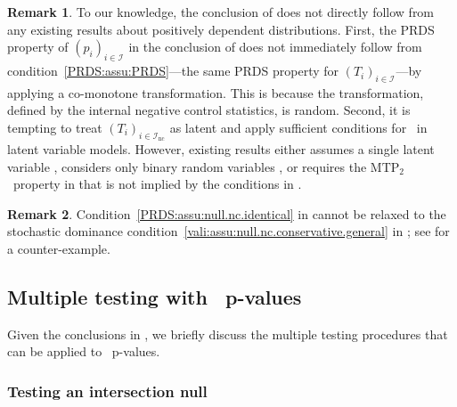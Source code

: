 \documentclass[a4paper,11pt]{article}
\theoremstyle{plain}
\theoremstyle{definition}
\newtheorem{remark}{Remark}
\def\calI{\mathcal{I}}
\theoremstyle{plain}
\newcommand{\pval}[1]{{p_{#1}}}
\newcommand{\testStatistics}[1]{{T_{#1}}}
\newcommand{\nickname}{{\text{RANC}}}
\newcommand{\hypothesisIndex}[1]{{\calI_{#1}}}
\newcommand{\PRDS}{{\text{PRDS}}}
\newcommand{\MTPTwo}{{$\text{MTP}_2$}}
\begin{document}
\begin{remark}
    To our knowledge, the conclusion of  does not
  directly follow from any existing results about positively dependent
  distributions. First, the PRDS property of $(\pval{i})_{i \in
  \hypothesisIndex{}}$ in the conclusion of  does not
immediately follow from condition~\ref{PRDS:assu:PRDS}---the same PRDS
property for $(\testStatistics{i})_{i \in \hypothesisIndex{}}$---by applying a
co-monotone transformation. This is because the transformation,
defined by the internal negative control statistics, is random. Second, it is tempting to treat
$(\testStatistics{i})_{i \in \hypothesisIndex{\text{nc}}}$ as latent
and apply sufficient conditions for \PRDS~in latent variable
models. However, existing results either assumes a single latent variable
\parencite{benjamini2001control}, considers only binary random
variables \parencite{holland1986conditional}, or requires the
\MTPTwo~property in \textcite{karlin1980classes} that is not implied
by the conditions in .
\end{remark}

\begin{remark} \label{rem:ia-cannot-relax}
Condition~\ref{PRDS:assu:null.nc.identical} in
 cannot be relaxed to the
stochastic dominance
condition~\ref{vali:assu:null.nc.conservative.general} in
; see  for a
counter-example.
\end{remark}


\subsection{Multiple testing with
  \nickname~p-values}\label{sec:multiple.testing}

Given the conclusions in , we
briefly discuss the multiple testing procedures that can be
applied to \nickname~p-values.


\subsubsection{Testing an intersection null}\label{sec:global.null}

\end{document}
